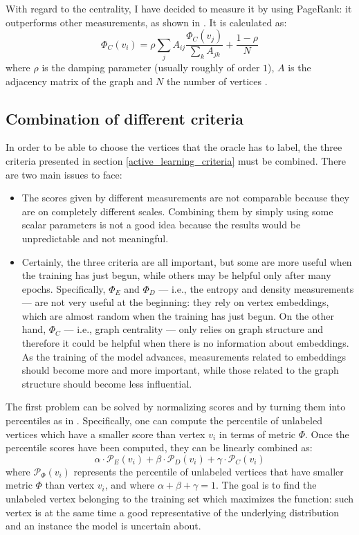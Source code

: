             With regard to the centrality, I have decided to measure it by using PageRank: it outperforms other measurements, as shown in \cite{Cai}. It is calculated as:
            \[\Phi_C\left(v_i\right) = \rho \sum_j A_{ij}\frac{\Phi_C\left(v_j\right)}{\sum_k A_{jk}} + \frac{1 - \rho}{N}\]
            where \(\rho\) is the damping parameter (usually roughly of order \(1\)), \(A\) is the adjacency matrix of the graph and \(N\) the number of vertices \cite{Newman}.
        \subsection{Combination of different criteria}\label{combination_criteria}
            In order to be able to choose the vertices that the oracle has to label, the three criteria presented in section \ref{active_learning_criteria} must be combined. There are two main issues to face:
            \begin{itemize}
                \item The scores given by different measurements are not comparable because they are on completely different scales. Combining them by simply using some scalar parameters is not a good idea because the results would be unpredictable and not meaningful.
                \item Certainly, the three criteria are all important, but some are more useful when the training has just begun, while others may be helpful only after many epochs. Specifically, \(\Phi_E\) and \(\Phi_D\) --- i.e., the entropy and density measurements --- are not very useful at the beginning: they rely on vertex embeddings, which are almost random when the training has just begun. On the other hand, \(\Phi_C\) --- i.e., graph centrality --- only relies on graph structure and therefore it could be helpful when there is no information about embeddings. As the training of the model advances, measurements related to embeddings should become more and more important, while those related to the graph structure should become less influential.
            \end{itemize}
            
            The first problem can be solved by normalizing scores and by turning them into percentiles as in \cite{Zhang}. Specifically, one can compute the percentile of unlabeled vertices which have a smaller score than vertex \(v_i\) in terms of metric \(\Phi\). Once the percentile scores have been computed, they can be linearly combined as:
            \[\alpha \cdot \mathcal{P}_E\left(v_i\right) + \beta \cdot \mathcal{P}_D\left(v_i\right) + \gamma \cdot \mathcal{P}_C\left(v_i\right)\]
            where \(\mathcal{P}_{\Phi}\left(v_i\right)\) represents the percentile of unlabeled vertices that have smaller metric \(\Phi\) than vertex \(v_i\), and where \(\alpha + \beta + \gamma = 1\). The goal is to find the unlabeled vertex belonging to the training set which maximizes the function: such vertex is at the same time a good representative of the underlying distribution and an instance the model is uncertain about.
            
